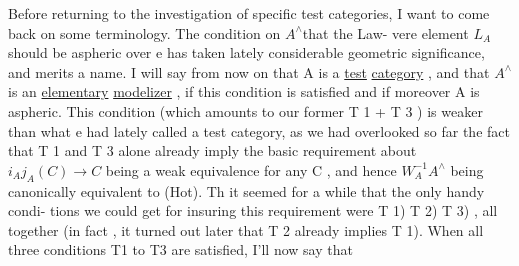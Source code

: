 Before returning to the investigation of specific test categories,
I want to come back on some terminology.  The condition on $A^\wedge$\hand{/}that the Law-%
vere element $L_A$ should be aspheric over e has taken lately considerable
geometric significance,  and merits a name.  I will say from now on that
A is a \uline{test} \uline{category} ,  and that $A^\wedge$is an \uline{elementary} \uline{modelizer} ,  if this
condition is satisfied\hand{,}  and if moreover A is aspheric.  This condition
 (which amounts to our former  T 1  + T 3 ) is weaker than what e had
lately called a test category,  as we had overlooked so far the fact that
T 1 and T 3  alone already imply the basic requirement about  $i_Aj_A(C) \longrightarrow C$
being a weak equivalence for any C , and hence $W_A^{-1}A^\wedge$ being canonically
equivalent to (Hot).  Th it seemed for a while that the only handy condi-%
tions we could get for insuring this requirement were T 1) T 2) T 3) ,
all together (in fact , it turned out later that T 2  already implies
T 1).  When all three conditions T1 to T3 are satisfied,  I'll now say that
